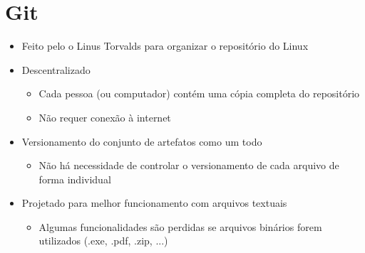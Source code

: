 \documentclass{beamer}
\newenvironment{slide}{\begin{frame}{\insertsection}}{\end{frame}}
\begin{document}
\section{Git}
\begin{slide}
    \begin{itemize}
        \item Feito pelo o Linus Torvalds para organizar o repositório do Linux
        \pause
        \item Descentralizado
        \begin{itemize}
            \pause
            \item Cada pessoa (ou computador) contém uma cópia completa do
                repositório
            \pause
            \item Não requer conexão à internet
        \end{itemize}
        \pause
        \item Versionamento do conjunto de artefatos como um todo
        \begin{itemize}
            \pause
            \item Não há necessidade de controlar o versionamento de cada
                arquivo de forma individual
        \end{itemize}
        \pause
        \item Projetado para melhor funcionamento com arquivos textuais
        \begin{itemize}
            \pause
            \item Algumas funcionalidades são perdidas se arquivos binários
                forem utilizados \pause (.exe, .pdf, .zip, ...)
        \end{itemize}
    \end{itemize}
\end{slide}
\end{document}
